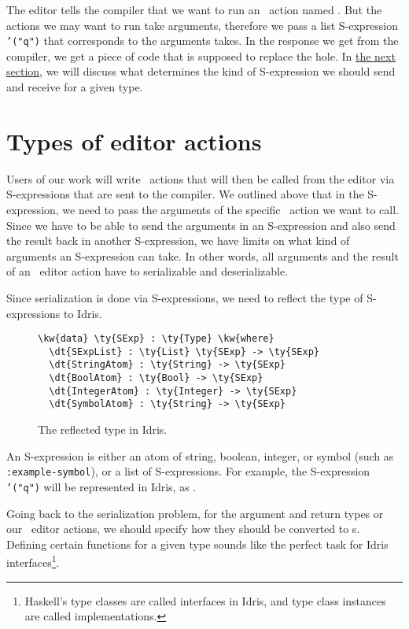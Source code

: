 The editor tells the compiler that we want to run an \Elab\ action named
. But the actions we may want to run take arguments, therefore we
pass a list S-expression \texttt{'("q")} that corresponds to the arguments
 takes.
In the response we get from the compiler, we get a piece of code that is
supposed to replace the hole. In \hyperref[sec:types]{the next section}, we
will discuss what determines the kind of S-expression we should send and
receive for a given type.

\section{Types of editor actions}\label{sec:types}

Users of our work will write \Elab\ actions that will then be called from the
editor via S-expressions that are sent to the compiler. We outlined above that
in the S-expression, we need to pass the arguments of the specific
\Elab\ action we want to call. Since we have to be able to send the arguments
in an S-expression and also send the result back in another S-expression, we
have limits on what kind of arguments an S-expression can take.
In other words, all arguments and the result of an \Elab\ editor action
have to serializable and deserializable.

Since serialization is done via S-expressions, we need to reflect the type of
S-expressions to Idris.

\begin{figure}[ht]
  \caption{The reflected type  in Idris.}
  \label{code:definitionSExp}
\begin{Verbatim}[framesep=2mm, label=\footnotesize{\normalfont{Idris}}, labelposition=topline]
\kw{data} \ty{SExp} : \ty{Type} \kw{where}
  \dt{SExpList} : \ty{List} \ty{SExp} -> \ty{SExp}
  \dt{StringAtom} : \ty{String} -> \ty{SExp}
  \dt{BoolAtom} : \ty{Bool} -> \ty{SExp}
  \dt{IntegerAtom} : \ty{Integer} -> \ty{SExp}
  \dt{SymbolAtom} : \ty{String} -> \ty{SExp}
\end{Verbatim}
\end{figure}

An S-expression is either an atom of string, boolean, integer, or symbol (such
as \texttt{:example-symbol}), or a list of S-expressions.
For example, the S-expression \texttt{'("q")} will be represented in Idris, as
.

Going back to the serialization problem, for the argument and return types or
our \Elab\ editor actions, we should specify how they should be converted to
s.  Defining certain functions for a given type sounds like the
perfect task for Idris interfaces\footnote{Haskell's type classes are called
interfaces in Idris, and type class instances are called implementations.}.

